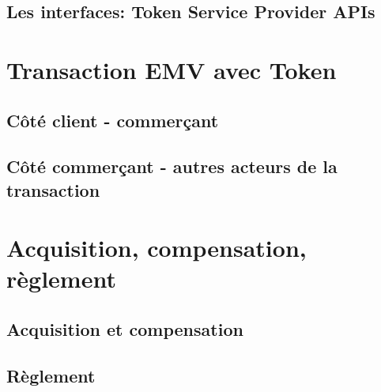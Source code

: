 \documentclass{rapportDeProjetENSICAEN}
\begin{document}
\subsection{Les interfaces: Token Service Provider APIs}

\section{Transaction EMV avec Token}
\subsection{Côté client - commerçant}
\subsection{Côté commerçant - autres acteurs de la transaction}

\section{Acquisition, compensation, règlement}
\subsection{Acquisition et compensation}
\subsection{Règlement}



\renewcommand\bibname{\underline{Références bibliographiques}}


\newpage


{\color{titre1}{\fontsize{16}{16} \selectfont {* Sur la dernière page (couverture) : \\ \\ \\
Résumé en français et en anglais avec mots clefs.}}}
\end{document}
